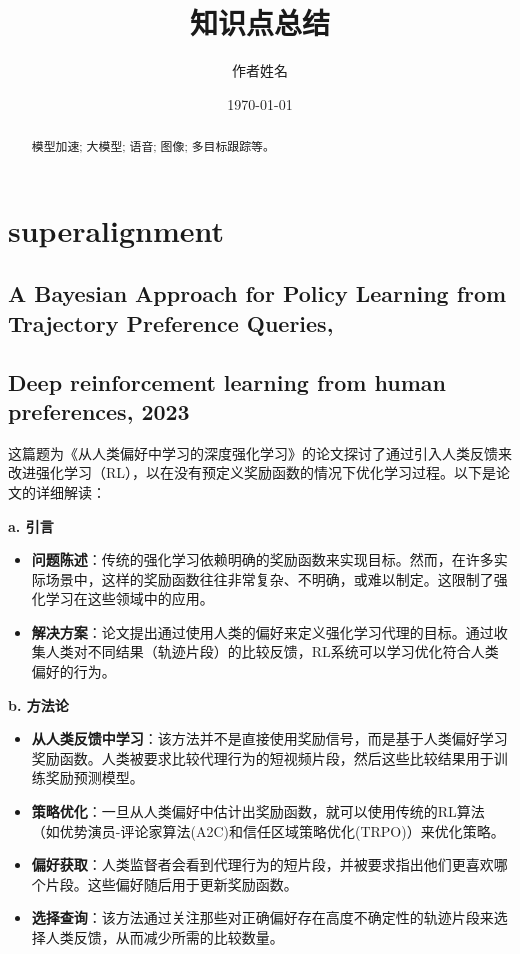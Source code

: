 \documentclass[twocolumn, 10pt]{article} %
\begin{document}
\title{知识点总结}
\author{作者姓名}
\date{\today}
\maketitle
\begin{abstract}
    模型加速; 大模型; 语音; 图像; 多目标跟踪等。
\end{abstract}




\section{superalignment}


\subsection{A Bayesian Approach for Policy Learning from Trajectory Preference Queries, }

\subsection{Deep reinforcement learning from human preferences,  2023}











这篇题为《从人类偏好中学习的深度强化学习》的论文探讨了通过引入人类反馈来改进强化学习（RL），以在没有预定义奖励函数的情况下优化学习过程。以下是论文的详细解读：

\noindent\textbf{a. 引言}
\begin{itemize}
    \item \textbf{问题陈述}：传统的强化学习依赖明确的奖励函数来实现目标。然而，在许多实际场景中，这样的奖励函数往往非常复杂、不明确，或难以制定。这限制了强化学习在这些领域中的应用。
    \item \textbf{解决方案}：论文提出通过使用人类的偏好来定义强化学习代理的目标。通过收集人类对不同结果（轨迹片段）的比较反馈，RL系统可以学习优化符合人类偏好的行为。
\end{itemize}

\noindent\textbf{b. 方法论}
\begin{itemize}
    \item \textbf{从人类反馈中学习}：该方法并不是直接使用奖励信号，而是基于人类偏好学习奖励函数。人类被要求比较代理行为的短视频片段，然后这些比较结果用于训练奖励预测模型。
    \item \textbf{策略优化}：一旦从人类偏好中估计出奖励函数，就可以使用传统的RL算法（如优势演员-评论家算法(A2C)和信任区域策略优化(TRPO)）来优化策略。
    \item \textbf{偏好获取}：人类监督者会看到代理行为的短片段，并被要求指出他们更喜欢哪个片段。这些偏好随后用于更新奖励函数。
    \item \textbf{选择查询}：该方法通过关注那些对正确偏好存在高度不确定性的轨迹片段来选择人类反馈，从而减少所需的比较数量。
\end{itemize}
\end{document}
